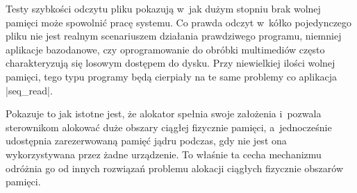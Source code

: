Testy szybkości odczytu pliku pokazują w~jak dużym stopniu brak wolnej
pamięci może spowolnić pracę systemu.  Co prawda odczyt w~kółko
pojedynczego pliku nie jest realnym scenariuszem działania prawdziwego
programu, niemniej aplikacje bazodanowe, czy oprogramowanie do obróbki
multimediów często charakteryzują się losowym dostępem do dysku.  Przy
niewielkiej ilości wolnej pamięci, tego typu programy będą cierpiały
na te same problemy co aplikacja \code|seq_read|.

Pokazuje to jak istotne jest, że alokator  spełnia swoje
założenia i~pozwala sterownikom alokować duże obszary ciągłej
fizycznie pamięci, a~jednocześnie udostępnia zarezerwowaną pamięć
jądru podczas, gdy nie jest ona wykorzystywana przez żadne urządzenie.
To właśnie ta cecha mechanizmu  odróżnia go od innych
rozwiązań problemu alokacji ciągłych fizycznie obszarów pamięci.
